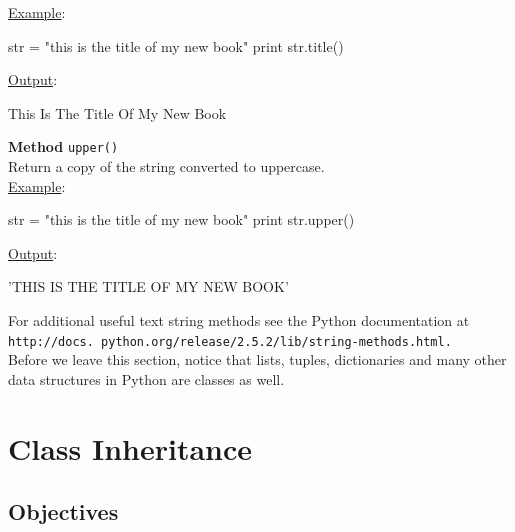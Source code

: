 \noindent
\underline{Example}:
\begin{bluecode}
str = "this is the title of my new book"
print str.title()
\end{bluecode}
\underline{Output}:
\begin{greencode}
This Is The Title Of My New Book
\end{greencode}
\vspace{4mm}

\noindent
{\bf Method} {\tt upper()}\\
Return a copy of the string converted to uppercase.\\

\noindent
\underline{Example}:
\begin{bluecode}
str = "this is the title of my new book"
print str.upper()
\end{bluecode}
\underline{Output}:
\begin{greencode}
'THIS IS THE TITLE OF MY NEW BOOK'
\end{greencode}
\vspace{4mm}

\noindent
For additional useful text string methods see the Python documentation at 
{\tt http://docs. python.org/release/2.5.2/lib/string-methods.html.} \\

\noindent
Before we
leave this section, notice that lists, tuples, dictionaries and many other 
data structures in Python are classes as well.



\section{Class Inheritance}

\subsection{Objectives}


